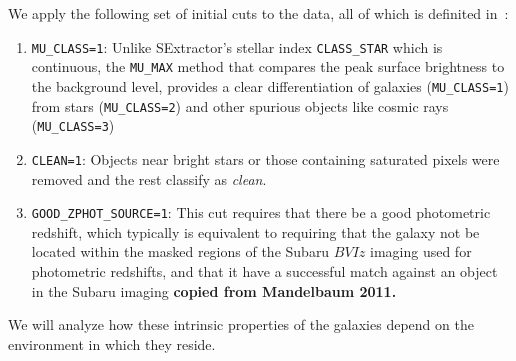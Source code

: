 \documentclass[twocolumn,useAMS,usenatbib]{mn2e}
\begin{document}
We apply the following set of initial cuts to the data, all of which is definited in~\cite{COSMOS_Alexie}:
\begin{enumerate}
 \item \texttt{MU\_CLASS=1}: Unlike SExtractor's stellar index \texttt{CLASS\_STAR} which is continuous, the \texttt{MU\_MAX} method that compares the peak surface brightness to the background level,
 provides a clear differentiation of galaxies (\texttt{MU\_CLASS=1}) from stars (\texttt{MU\_CLASS=2}) and other spurious objects like cosmic rays (\texttt{MU\_CLASS=3})
 
 \item \texttt{CLEAN=1}: Objects near bright stars or those containing saturated pixels were removed and the rest classify as \emph{clean}.
 
 \item \texttt{GOOD\_ZPHOT\_SOURCE=1}: This cut requires that there be a good photometric redshift, which typically is equivalent to requiring that the galaxy not be located within
                                       the masked regions of the Subaru $BVIz$ imaging used for photometric redshifts, and that it have a successful match against an object in the Subaru imaging
                                       {\bf copied from Mandelbaum 2011.}
\end{enumerate}
  
We will analyze how these intrinsic properties of the galaxies depend on the environment in which they reside.
% 
% 
% 
% 
\end{document}
